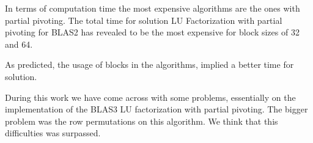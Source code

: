 \documentclass[conference,compsoc]{IEEEtran}
\begin{document}
In terms of computation time the most expensive algorithms are the ones with partial pivoting. The total time for solution LU Factorization with partial pivoting for BLAS2 has revealed to be the most expensive for block sizes of 32 and 64. \par 

As predicted, the usage of blocks in the algorithms, implied a better time for solution. \par

During this work we have come across with some problems, essentially on the implementation of the BLAS3 LU factorization with partial pivoting. The bigger problem was the row permutations on this algorithm. We think that this difficulties was surpassed.
%
%



%
%
\end{document}
